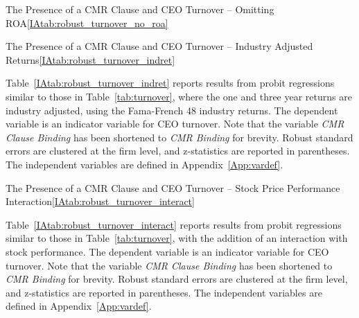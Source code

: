 \documentclass[12pt]{article}
\begin{document}
\begin{appendices}
\begin{singlespace}
\begin{papertable}{The Presence of a CMR Clause and CEO Turnover -- Omitting ROA}{\ref{IAtab:robust_turnover_no_roa}}{}
  \startdata
  

\end{papertable}




\begin{papertable}{The Presence of a CMR Clause and CEO Turnover -- Industry Adjusted Returns}{\ref{IAtab:robust_turnover_indret}}{}
  \label{IAtab:robust_turnover_indret}

  Table~\ref{IAtab:robust_turnover_indret} reports results from probit regressions similar to those in Table~\ref{tab:turnover}, where the one and three year returns are industry adjusted, using the Fama-French 48 industry returns.
  The dependent variable is an indicator variable for CEO turnover.
  Note that the variable \textit{CMR Clause Binding} has been shortened to \textit{CMR Binding} for brevity.
  Robust standard errors are clustered at the firm level, and z-statistics are reported in parentheses.
  The independent variables are defined in Appendix~\ref{App:vardef}.
  \postamblesig

  \startdata
  

\end{papertable}




\begin{papertable}{The Presence of a CMR Clause and CEO Turnover -- Stock Price Performance Interaction}{\ref{IAtab:robust_turnover_interact}}{}
  \label{IAtab:robust_turnover_interact}

  Table~\ref{IAtab:robust_turnover_interact} reports results from probit regressions similar to those in Table~\ref{tab:turnover}, with the addition of an interaction with stock performance.
  The dependent variable is an indicator variable for CEO turnover.
  Note that the variable \textit{CMR Clause Binding} has been shortened to \textit{CMR Binding} for brevity.
  Robust standard errors are clustered at the firm level, and z-statistics are reported in parentheses.
  The independent variables are defined in Appendix~\ref{App:vardef}.
  \postamblesig

  \startdata
  


\end{papertable}
\end{singlespace}
\end{appendices}
\end{document}
